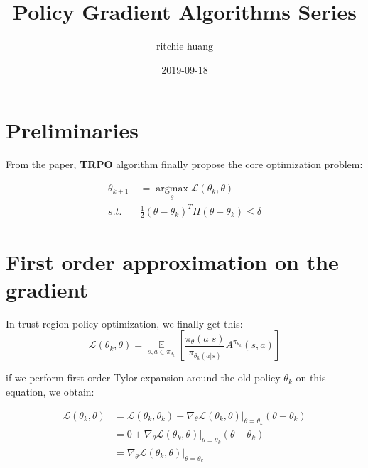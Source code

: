 \documentclass[a4paper, titlepage, 12pt]{article}
\title{Policy Gradient Algorithms Series}
\author{ritchie huang}
\date{2019-09-18}
\begin{document}
\maketitle 

\tableofcontents
\newpage

\section{Preliminaries}
From the paper, \textbf{TRPO} algorithm finally propose the core optimization problem:

\begin{equation}
    \begin{aligned}
    \theta_{k + 1} &= \mathop{argmax} \limits_{\theta} \mathcal{L}(\theta_{k}, \theta) \\
               s.t.\quad&\frac{1}{2} (\theta - \theta_{k})^{T} H (\theta - \theta_{k}) \leq \delta 
    \end{aligned}
\end{equation}

\section{First order approximation on the gradient}
In trust region policy optimization, we finally get this:
\begin{equation}
    \mathcal{L}(\theta_{k}, \theta) = \mathop{\mathbb{E}} \limits_{s, a \in \pi_{\theta_k}} \left[ \frac{\pi_{\theta}(a | s)}{\pi_{\theta_{k}(a | s)}} A^{\pi_{\theta_{k}}}(s, a) \right]
\end{equation}

if we perform first-order Tylor expansion around the old policy $\theta_{k}$ on this equation, we obtain:

\begin{equation}
    \begin{aligned}
    \mathcal{L}(\theta_{k}, \theta) &= \mathcal{L}(\theta_{k}, \theta_{k}) + \nabla_{\theta} \mathcal{L}(\theta_{k}, \theta) |_{\theta = \theta_{k}} (\theta - \theta_{k}) \\
                                    &= 0 + \nabla_{\theta} \mathcal{L}(\theta_{k}, \theta) |_{\theta = \theta_{k}} (\theta - \theta_{k}) \\
                                    &= \nabla_{\theta} \mathcal{L}(\theta_{k}, \theta) |_{\theta = \theta_{k}}
    \end{aligned}
\end{equation}
\end{document}

